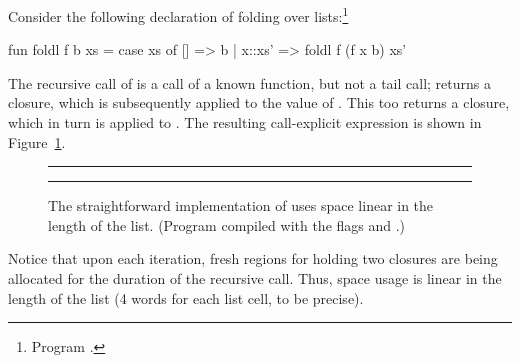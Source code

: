 \documentclass[12pt]{book}
\begin{document}
Consider the following declaration of folding over lists:\footnote{Program
.}
\begin{smlcode}
  fun foldl f b xs =
    case xs of
      [] => b
    | x::xs' => foldl f (f x b) xs'
\end{smlcode}
The recursive call of
%
%
%
 is a call of a known function, but not a tail call; 
returns a closure, which is subsequently applied to the value of . This too returns a closure, which in turn is applied to .  The
resulting call-explicit expression is shown in Figure~\ref{fold1.fig}.
\begin{figure}
\hrule \medskip
{}
\caption{The straightforward implementation of  uses space linear in
  the length of the list. (Program  compiled with the
  flags  and .)}
\medskip \hrule \label{fold1.fig}
\end{figure}
Notice that upon each iteration, fresh regions for holding two closures are
being allocated for the duration of the recursive call.  Thus, space usage is
linear in the length of the list (4 words for each list cell, to be precise).
\end{document}
